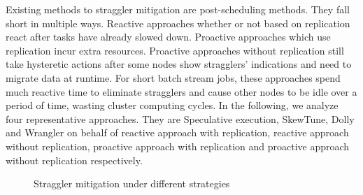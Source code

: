   Existing methods to straggler mitigation are post-scheduling methods. They fall short in multiple ways. Reactive approaches whether or not based on replication react after tasks have already slowed down. Proactive approaches which use replication incur extra resources. Proactive approaches without replication still take hysteretic actions after some nodes show stragglers' indications and need to migrate data at runtime. For short batch stream jobs, these approaches spend much reactive time to eliminate stragglers and cause other nodes to be idle over a period of time, wasting cluster computing cycles. In the following, we analyze four representative approaches. They are Speculative execution, SkewTune, Dolly and Wrangler on behalf of reactive approach with replication, reactive approach without replication, proactive approach with replication and proactive approach without replication respectively.
  \begin{figure}[htbp]
    \centering
    \hfill
    \hfill
    \caption{Straggler mitigation under different strategies}
    \label{Fig. 2:}
  \end{figure}

